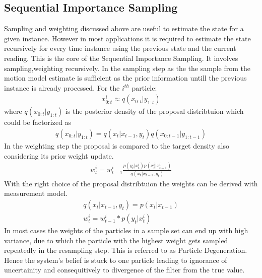 \subsection{Sequential Importance Sampling}
Sampling and weighting discussed above are useful to estimate the state for a given instance. However in most applications it is required to estimate the state
recursively for every time instance using the previous state and the current reading. This is the core of the Sequential Importance Sampling. It involves 
sampling,weighting recursively. In the sampling step as the the sample from the motion model estimate is sufficient as the prior information untill the previous
instance is already processed.
For the ${i}^{th}$ particle:
\begin{gather} \label{SIS_Sample}
    x_{0:t}^{i} \approx q(x_{0:t}| y_{1:t}) 
\end{gather}
where ${q(x_{0:t}| y_{1:t})}$ is the posterior density of the proposal distribtuion which could be factorized as 
\begin{gather} \label{SIS_propfact}
    q(x_{0:t}| y_{1:t}) = q(x_t|x_{t-1},y_{t}) q(x_{0:t-1}| y_{1:t-1}) 
\end{gather}
In the weighting step the proposal is compared to the target density also considering its prior weight update. 
\begin{gather} \label{SIS_weight}
    w_{t}^{i} = w_{t-1}^{i} \frac{p(y_{t}|x_{t}^{i}) p(x_{t}^{i}|x_{t-1}^{i})}{q(x_t|x_{t-1},y_{t})}  
\end{gather}
With the right choice of the proposal distribtuion the weights can be derived with measurement model.
\begin{gather} \label{SIS_weightprop}
    q(x_t|x_{t-1},y_{t}) = p(x_t|x_{t-1})\\
    w_{t}^{i} = w_{t-1}^{i} * p(y_{t}|x_{t}^{i})
\end{gather}
In most cases the weights of the particles in a sample set can end up with high variance, due to which the particle with the highest weight gets sampled
repeatedly in the resampling step. This is referred to as Particle Degeneration. Hence the system's belief is stuck to one particle leading to ignorance of 
uncertainity and consequitively to divergence of the filter from the true value.

